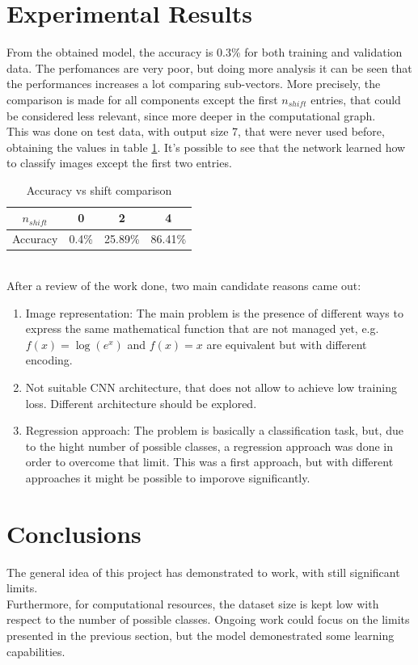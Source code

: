 \documentclass[11pt,a4paper]{scrartcl}
\begin{document}
	\section{Experimental Results}
	From the obtained model, the accuracy is 0.3\% for both training and validation data. The perfomances are very poor, but doing more analysis it can be seen that the performances increases a lot comparing sub-vectors. More precisely, the comparison is made for all components except the first $n_{shift}$ entries, that could be considered less relevant, since more deeper in the computational graph.\\
	This was done on test data, with output size 7, that were never used before, obtaining the values in table \ref{table:accshift}.
	It's possible to see that the network learned how to classify images except the first two entries.
		\begin{table}[h!]
		\centering
		\begin{tabular}{c|c c c}
			\hline
			$n_{shift}$ & 0 & 2 & 4\\
			\hline
			Accuracy & 0.4\% & 25.89\% & 86.41\%
		\end{tabular}
		\caption{Accuracy vs shift comparison}
		\label{table:accshift}
	\end{table}\\
	After a review of the work done, two main candidate reasons came out:
	\begin{enumerate}
		\item Image representation: The main problem is the presence of different ways to express the same mathematical function that are not managed yet, e.g. $f(x) = \log(e^x)$ and $f(x) = x$ are equivalent but with different encoding.
		\item Not suitable CNN architecture, that does not allow to achieve low training loss. Different architecture should be explored.
		\item Regression approach: The problem is basically a classification task, but, due to the hight number of possible classes, a regression approach was done in order to overcome that limit. This was a first approach, but with different approaches it might be possible to imporove significantly.
	\end{enumerate}
	\section{Conclusions}
	The general idea of this project has demonstrated to work, with still significant limits.\\
	Furthermore, for computational resources, the dataset size is kept low with respect to the number of possible classes. Ongoing work could focus on the limits presented in the previous section, but the model demonestrated some learning capabilities.
\end{document}
